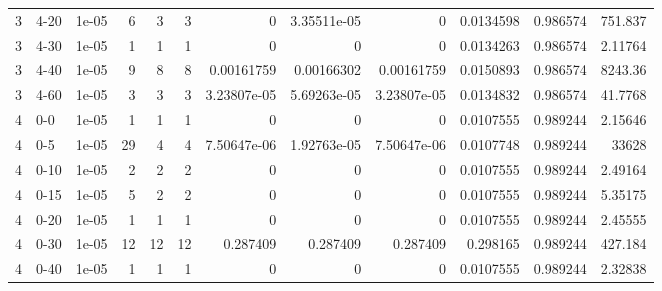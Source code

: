 \begin{tabular}{rlrrrrrrrrrr}
     3 & 4-20   &      1e-05 &           6 &                 3 &                 3 &     0           &     3.35511e-05 &      0           &        0.0134598 &               0.986574 &         751.837    \\
     3 & 4-30   &      1e-05 &           1 &                 1 &                 1 &     0           &     0           &      0           &        0.0134263 &               0.986574 &           2.11764  \\
     3 & 4-40   &      1e-05 &           9 &                 8 &                 8 &     0.00161759  &     0.00166302  &      0.00161759  &        0.0150893 &               0.986574 &        8243.36     \\
     3 & 4-60   &      1e-05 &           3 &                 3 &                 3 &     3.23807e-05 &     5.69263e-05 &      3.23807e-05 &        0.0134832 &               0.986574 &          41.7768   \\
     4 & 0-0    &      1e-05 &           1 &                 1 &                 1 &     0           &     0           &      0           &        0.0107555 &               0.989244 &           2.15646  \\
     4 & 0-5    &      1e-05 &          29 &                 4 &                 4 &     7.50647e-06 &     1.92763e-05 &      7.50647e-06 &        0.0107748 &               0.989244 &       33628        \\
     4 & 0-10   &      1e-05 &           2 &                 2 &                 2 &     0           &     0           &      0           &        0.0107555 &               0.989244 &           2.49164  \\
     4 & 0-15   &      1e-05 &           5 &                 2 &                 2 &     0           &     0           &      0           &        0.0107555 &               0.989244 &           5.35175  \\
     4 & 0-20   &      1e-05 &           1 &                 1 &                 1 &     0           &     0           &      0           &        0.0107555 &               0.989244 &           2.45555  \\
     4 & 0-30   &      1e-05 &          12 &                12 &                12 &     0.287409    &     0.287409    &      0.287409    &        0.298165  &               0.989244 &         427.184    \\
     4 & 0-40   &      1e-05 &           1 &                 1 &                 1 &     0           &     0           &      0           &        0.0107555 &               0.989244 &           2.32838  \\

\end{tabular}
